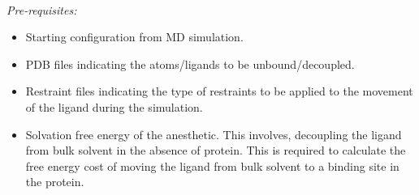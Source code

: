 \documentclass[12pt]{article}
\begin{document}
 \hfill \break
\\
\textit{Pre-requisites:} 
\begin{itemize}
\item Starting configuration from MD simulation.
\item PDB files indicating the atoms/ligands to be unbound/decoupled.
\item Restraint files indicating the type of restraints to be applied to the movement of the ligand during the simulation.
\item Solvation free energy of the anesthetic. This involves, decoupling the ligand from bulk solvent in the absence of protein. This is required to calculate the free energy cost of moving the ligand from bulk solvent to a binding site in the protein.
\end{itemize}
\end{document}
